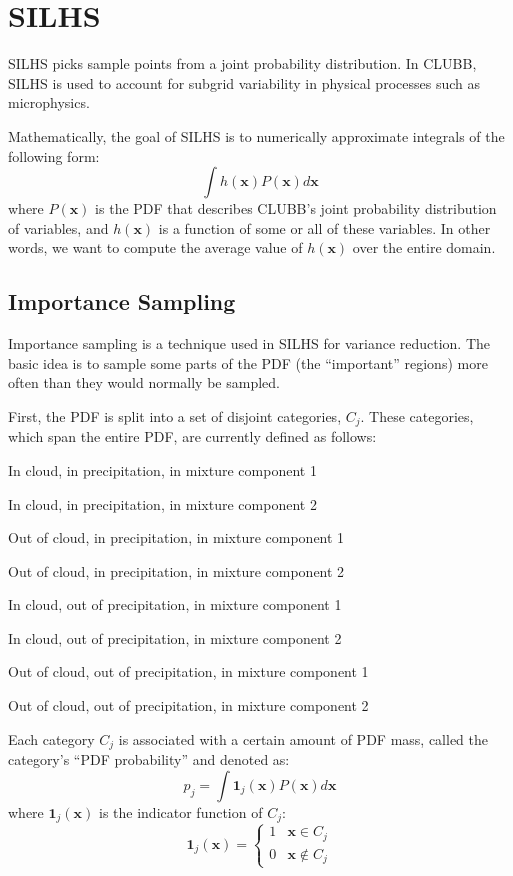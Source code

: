 \documentclass[11pt,fleqn]{article}
\begin{document}
\section{SILHS}

SILHS picks sample points from a joint probability distribution. In CLUBB, SILHS
is used to account for subgrid variability in physical processes such as
microphysics.

Mathematically, the goal of SILHS is to numerically approximate integrals of the
following form:
\begin{equation}
\int h(\mathbf{x}) P(\mathbf{x}) d\mathbf{x} \label{SILHS integral form}
\end{equation}
where $P(\mathbf{x})$ is the PDF that describes CLUBB's joint probability
distribution of variables, and $h(\mathbf{x})$ is a function of some or all of
these variables. In other words, we want to compute the average value of
$h(\mathbf{x})$ over the entire domain.

\subsection{Importance Sampling}

Importance sampling is a technique used in SILHS for variance reduction. The
basic idea is to sample some parts of the PDF (the ``important'' regions) more
often than they would normally be sampled.

First, the PDF is split into a set of disjoint categories, $C_j$. These
categories, which span the entire PDF, are currently defined as follows:
\begin{enumerate*}
\item In cloud, in precipitation, in mixture component 1
\item In cloud, in precipitation, in mixture component 2
\item Out of cloud, in precipitation, in mixture component 1
\item Out of cloud, in precipitation, in mixture component 2
\item In cloud, out of precipitation, in mixture component 1
\item In cloud, out of precipitation, in mixture component 2
\item Out of cloud, out of precipitation, in mixture component 1
\item Out of cloud, out of precipitation, in mixture component 2
\end{enumerate*}

Each category $C_j$ is associated with a certain amount of PDF mass, called the
category's ``PDF probability'' and denoted as:
\begin{equation}
p_j = \int \mathbf{1}_j(\mathbf{x}) P(\mathbf{x}) d\mathbf{x}
\end{equation}
where $\mathbf{1}_j(\mathbf{x})$ is the indicator function of $C_j$:
\begin{equation}
\mathbf{1}_j(\mathbf{x}) =
\begin{cases}
1 & \mathbf{x} \in C_j \\
0 & \mathbf{x} \notin C_j
\end{cases}
\end{equation}
\end{document}
